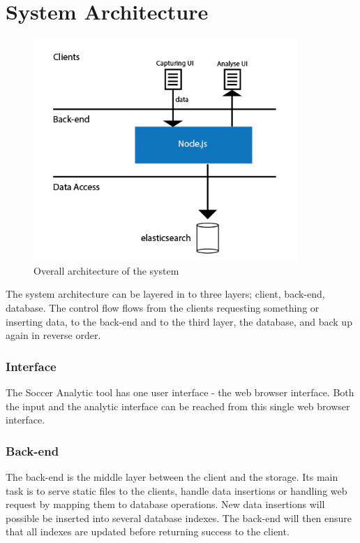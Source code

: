 

\section{System Architecture}

\begin{figure}[ht!]
\centering
\includegraphics[width=100mm]{images/general/arhitecture.png}
\caption{Overall architecture of the system }
\label{overflow}
\end{figure}

The system architecture can be layered in to three layers; client, back-end, database. The control flow flows from the clients requesting something or inserting data, to the back-end and to the third layer, the database, and back up again in reverse order. 

\subsubsection{Interface}

The Soccer Analytic tool has one user interface - the web browser interface. Both the input and the analytic interface can be reached from this single web browser interface.

\subsubsection{Back-end}

The back-end is the middle layer between the client and the storage. Its main task is to serve static files to the clients, handle data insertions or handling web request by mapping them to database operations. New data insertions will possible be inserted into several database indexes. The back-end will then ensure that all indexes are updated before returning success to the client.

